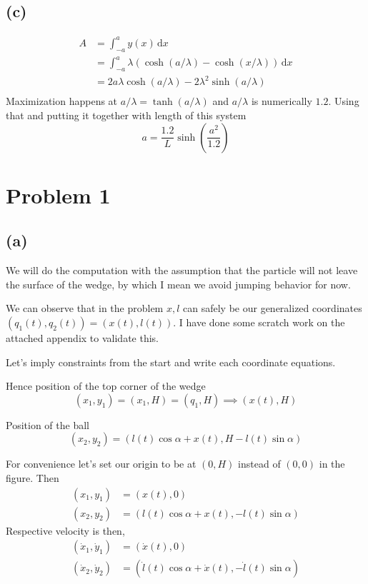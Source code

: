 \documentclass[letter, 10pts]{article}
\begin{document}
\subsection*{(c)} 
\begin{align*}
	A &= \int_{-a}^{a} y(x) \, \mathrm{d} x 
\\
&= \int_{-a}^{a}  \lambda 
\left(\cosh (a / \lambda) - \cosh ( x / \lambda )\right) \,\mathrm{d} x \\
&= 2 a \lambda \cosh(a / \lambda) - 2 \lambda ^2 \sinh ( a / \lambda ) \\
\end{align*}
Maximization happens at $ a / \lambda = \tanh ( a / \lambda ) $ and $a / \lambda$ is numerically $1.2$. Using that and putting it together with length of this system 
\[
a = \frac{1.2}{L} \sinh \left(\frac{a^2}{1.2}\right)
\] 

\section*{Problem 1}
\subsection*{(a)} 
We will do the computation with the assumption that the particle will not leave the surface of the wedge, by which I mean we avoid jumping behavior for now. 

We can observe that in the problem $x,l$ can safely be our generalized coordinates $(q_1(t), q_2(t) ) = (x(t), l(t))$. I have done some scratch work on the attached appendix to validate this. 

Let's imply constraints from the start and write each coordinate equations. 

Hence position of the top corner of the wedge
\[
	(x_1, y_1) = (x_1, H) = (q_1, H) \implies (x(t), H)
\]

Position of the ball
\[
	(x_2, y_2) = (l(t) \cos \alpha + x(t), H - l(t) \sin \alpha )
\]

For convenience let's set our origin to be at $(0, H)$ instead of $(0,0)$ in the figure. Then 
\begin{align*} 
	(x_1, y_1) &= (x(t), 0) \\ 
	(x_2, y_2) &= (l(t) \cos \alpha + x(t),  - l(t) \sin \alpha )
\end{align*}
Respective velocity is then, 
\begin{align*} 
	(\dot x_1,  \dot y_1) &= ( \dot x(t), 0) \\ 
	(\dot x_2, \dot y_2) &= (\dot l(t) \cos \alpha + \dot x(t),  - \dot l(t) \sin \alpha )
\end{align*}
\end{document}
